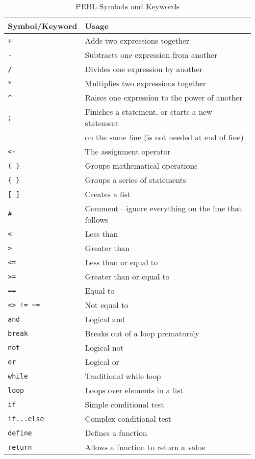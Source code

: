 \begin{table}[htbp]
\flushleft
\caption{PEBL Symbols and Keywords}
\begin{tabular}{ll}
\toprule
\textbf{Symbol/Keyword}& \textbf{Usage}\\
\midrule
\verb-+-  &                  Adds two expressions together\\
\verb+-+  &                  Subtracts one expression from another\\
\verb+/+  &                  Divides one expression by another\\
\verb+*+  &                  Multiplies two expressions together\\
\verb+^+  &                  Raises one expression  to the power of another\\
\verb+;+  &                  Finishes a statement, or starts a new statement\\              &                  
on the same line (is not needed at end of line)\\
\verb+<-+  &                 The assignment operator\\
\verb+( )+ &                 Groups mathematical operations\\
\verb+{ }+ &                 Groups a series of statements\\
\verb+[ ]+ &                 Creates a list\\
\verb+#+   &                 Comment---ignore everything on the line that follows\\
\verb+<+   &                 Less than\\
\verb+>+   &                 Greater than\\
\verb+<=+  &                 Less than or equal to\\
\verb+>=+  &                 Greater than or equal to\\
\verb+==+  &                 Equal to\\
\verb+<> != ~=+&             Not equal to\\
\texttt{and}   &               Logical and\\
\texttt{break} &               Breaks out of a loop prematurely\\
\texttt{not}   &               Logical not\\
\texttt{or}    &               Logical or\\
\texttt{while} &               Traditional while loop\\
\texttt{loop}  &               Loops over elements in a list\\
\texttt{if}    &               Simple conditional test\\
\texttt{if...else}&            Complex conditional test\\
\texttt{define}   &            Defines a function\\
\texttt{return}&               Allows a function to return a value\\
\bottomrule
\end{tabular}
\label{tab:symbols}
\end{table}


